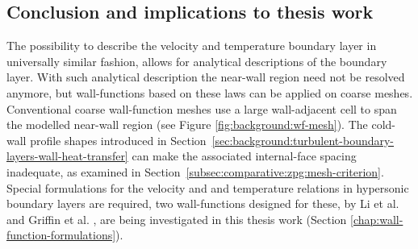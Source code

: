 \subsection{Conclusion and implications to thesis work}

The possibility to describe the velocity and temperature boundary layer in universally similar fashion, allows for analytical descriptions of the boundary layer. With such analytical description the near-wall region need not be resolved anymore, but wall-functions based on these laws can be applied on coarse meshes. Conventional coarse wall-function meshes use a large wall-adjacent cell to span the modelled near-wall region (see Figure \ref{fig:background:wf-mesh}). The cold-wall profile shapes introduced in Section~\ref{sec:background:turbulent-boundary-layers-wall-heat-transfer} can make the associated internal-face spacing inadequate, as examined in Section~\ref{subsec:comparative:zpg:mesh-criterion}. Special formulations for the velocity and and temperature relations in hypersonic boundary layers are required, two wall-functions designed for these, by Li et al. \cite{li2025WF} and Griffin et al. \cite{griffin2023WF}, are being investigated in this thesis work (Section \ref{chap:wall-function-formulations}).